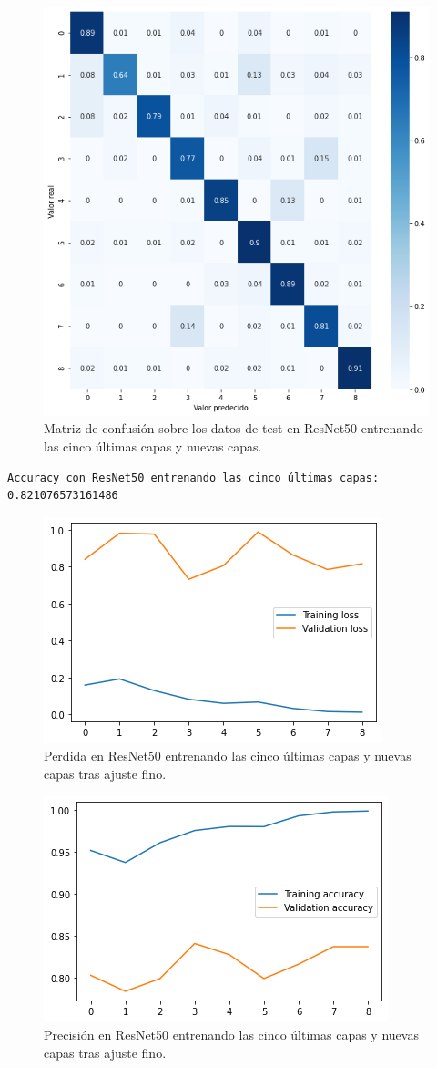\begin{figure}[H]
  \centering
  \includegraphics[width=0.5\linewidth]{Imagenes/entrenamiento_redes/5-ult/resnet_5ult_matriz.png}
  \caption{Matriz de confusión sobre los datos de test en ResNet50 entrenando las cinco últimas capas y nuevas capas.}
\end{figure}

\begin{lstlisting}
Accuracy con ResNet50 entrenando las cinco últimas capas: 0.821076573161486
\end{lstlisting}




\begin{figure}[H]
  \centering
  \includegraphics[width=0.5\linewidth]{Imagenes/entrenamiento_redes/5-ult/resnet_5fine_loss.png}
  \caption{Perdida en ResNet50 entrenando las cinco últimas capas y nuevas capas tras ajuste fino.}
\end{figure}

\begin{figure}[H]
  \centering
  \includegraphics[width=0.5\linewidth]{Imagenes/entrenamiento_redes/5-ult/resnet_5fine_acc.png}
  \caption{Precisión en ResNet50 entrenando las cinco últimas capas y nuevas capas tras ajuste fino.}
\end{figure}

